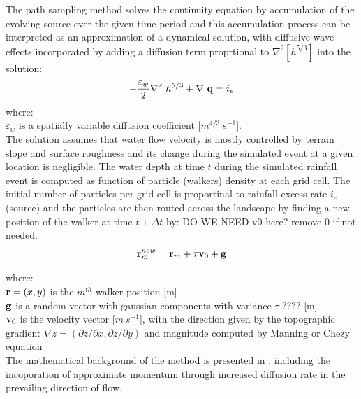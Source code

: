 \documentclass[gmd, manuscript]{copernicus}
\begin{document}
The path sampling method solves the continuity equation by accumulation of the evolving source
over the given time period and this accumulation process can be interpreted as
an approximation of a dynamical solution,
with diffusive wave effects incorporated by adding a diffusion term proprtional to
$ \nabla^2 [h^{5/3}]$
into the solution:
\begin{equation}
\label{eq:difwater}
-{\varepsilon_w\over 2 }\nabla^2 ~ h^{5/3}
+\nabla ~ {\bf q} = i_e
\end{equation}
{\small
\noindent
 where: \\
 \noindent
 \hspace*{0.5em} $\varepsilon_w$ is a spatially variable diffusion coefficient [$\unit{m}^{4/3}~\unit{s}^{-1}$]. \\
}
The solution assumes that water flow velocity is mostly controlled by terrain slope and surface roughness 
and its change during the simulated event at a given location is negligible. 
The water depth at time $t$ during the simulated rainfall event
 is computed as function of particle (walkers) density at each grid cell. 
The initial number of particles per grid cell is proportinal to rainfall excess rate $i_e$ (source)
and the particles are then routed across the landscape by finding a new position of the walker at time $t + \Delta t$ by:
DO WE NEED v0 here? remove 0 if not needed.
\begin{equation}
{\bf r}_m^{new}={\bf r}_m + \tau {\bf v}_0 + {\bf g}
\end{equation}

{\small
\noindent
where: \\
\noindent
\hspace*{0.5em} ${\bf r} = (x, y)$ is the $m^{th}$ walker position [\unit{m}]\\
\hspace*{0.5em} ${\bf g}$ is a random vector with gaussian components with variance $\tau$ ????  [\unit{m}]\\
\hspace*{0.5em} ${\bf v}_0 $ is the velocity vector [$\unit{m~s^{-1}}$],  
 with the direction given by the topographic gradient $\nabla z = (\partial z / \partial x, \partial z / \partial y)$
and magnitude computed by Manning or Chezy equation\\ 
}
The mathematical background of the method is presented in \citep{Mitas1998,Mitasova2005}, including the incoporation
of approximate momentum through increased diffusion rate in the prevailing direction of flow.
\end{document}
